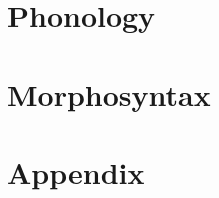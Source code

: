 \documentclass[fontsize=12pt,twoside=false,numbers=noenddot]{class/kaobook}
\begin{document}


\part{Phonology}



\part{Morphosyntax}









\part{Appendix}

\appendix

% 



\backmatter
\end{document}
